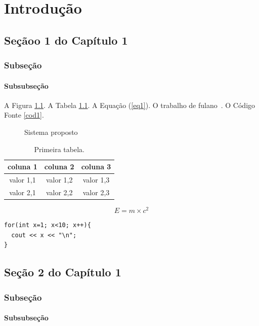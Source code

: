 \chapter{Introdução}

\section{Seçãoo 1 do Capítulo 1}
\subsection{Subseção}
\subsubsection{Subsubseção}

A Figura \ref{fig:sistemaProposto}. A Tabela \ref{tab:tabelaTeste}. A Equação (\ref{eq1}). O trabalho de fulano~\cite{ref1}. O Código Fonte \ref{cod1}.

\begin{figure}[htbp]	
\begin{center}
	\end{center}
	\caption{Sistema proposto}
	\label{fig:sistemaProposto}
\end{figure}

\begin{table}[htpb]
\begin{center}
\begin{tabular}{|c|c|c|}
\hline
coluna 1 & coluna 2 & coluna 3 \\
\hline
valor 1,1 & valor 1,2 & valor 1,3 \\
valor 2,1 & valor 2,2 & valor 2,3 \\
\hline
\end{tabular}
\end{center}
\caption{Primeira tabela.}
\label{tab:tabelaTeste}
\end{table}

\begin{equation}
E = m \times c^2
\label{eq1}
\end{equation}

\begin{lstlisting}[caption={Loop simples},label=cod1,numbers=none]
for(int x=1; x<10; x++){
  cout << x << "\n";
}
\end{lstlisting}

\section{Seção 2 do Capítulo 1}  
\subsection{Subseção}
\subsubsection{Subsubseção}


